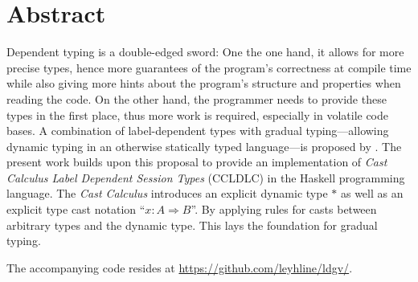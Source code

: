 \chapter*{Abstract}

Dependent typing is a double-edged sword: One the one hand, it allows for more precise types, hence more guarantees of the program's correctness at compile time while also giving more hints about the program's structure and properties when reading the code. On the other hand, the programmer needs to provide these types in the first place, thus more work is required, especially in volatile code bases. A combination of label-dependent types with gradual typing---allowing dynamic typing in an otherwise statically typed language---is proposed by \cite{fu2021}. The present work builds upon this proposal to provide an implementation of \emph{Cast Calculus Label Dependent Session Types} (CCLDLC) in the Haskell programming language. The \emph{Cast Calculus} introduces an explicit dynamic type $\ast$ as well as an explicit type cast notation ``$x : A \Rightarrow B$''. By applying rules for casts between arbitrary types and the dynamic type. This lays the foundation for gradual typing.

The accompanying code resides at \url{https://github.com/leyhline/ldgv/}. 
